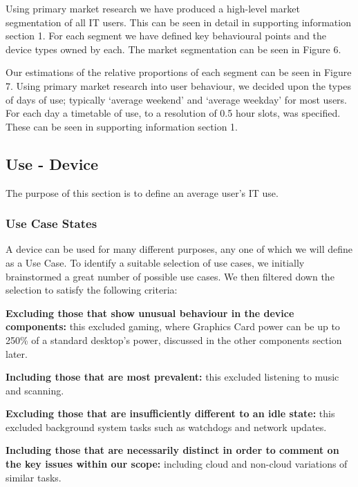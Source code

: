 \documentclass[conference]{IEEEtran}
\begin{document}
Using primary market research we have produced a high-level market
segmentation of all IT users. This can be seen in detail in supporting
information section 1. For each segment we have defined key
behavioural points and the device types owned by each. The market
segmentation can be seen in Figure 6.

Our estimations of the relative proportions of each segment can be seen in Figure 7.
Using primary market research into user behaviour, we decided upon the
types of days of use; typically `average weekend' and `average
weekday' for most users. For each day a timetable of use, to a
resolution of 0.5 hour slots, was specified. These can be seen in
supporting information section 1.


\subsection{Use - Device}

The purpose of this section is to define an average user’s IT use.

\subsubsection{Use Case States}

A device can be used for many different purposes, any one of which we will define as a Use Case.
To identify a suitable selection of use cases, we initially
brainstormed a great number of possible use cases. We then filtered
down the selection to satisfy the following criteria:

{\textbf{Excluding those that show unusual behaviour in the device
    components:}} this excluded gaming, where Graphics Card power can be up to 250\% of
a standard desktop’s power, discussed in the other components section
later.

{\textbf{Including those that are most prevalent:}} this excluded listening to
music and scanning.

{\textbf{Excluding those that are insufficiently different to an idle
    state:}} this excluded background system tasks such as watchdogs and network
updates.

{\textbf{Including those that are necessarily distinct in order to
    comment on the key issues within our scope:}} including cloud and
non-cloud variations of similar tasks.

The final use case selection can be seen in Figure 8.

\subsubsection{Use Case Characteristics}
\end{document}
